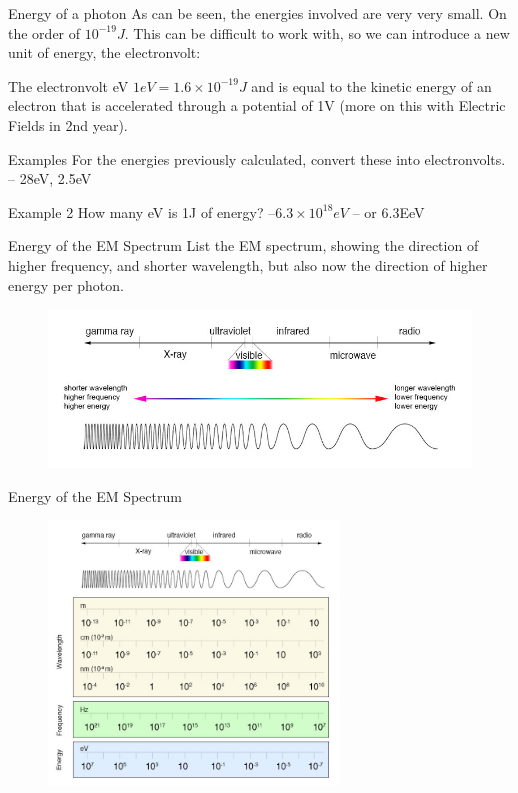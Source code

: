\documentclass[../Main.tex]{subfiles}
\begin{document}
\begin{frame}{Energy of a photon}
    As can be seen, the energies involved are very very small. On the order of $10^{-19}J$. This can be difficult to work with, so we can introduce a new unit of energy, the electronvolt:
    
    \begin{block}{The electronvolt eV}
    $1eV = 1.6\times10^{-19}J$ and is equal to the kinetic energy of an electron that is accelerated through a potential of 1V (more on this with Electric Fields in 2nd year).
    \end{block}
    \pause
    \begin{exampleblock}{Examples}
    For the energies previously calculated, convert these into electronvolts. \pause
    -- 28eV, 2.5eV
    \end{exampleblock}\pause
    \begin{exampleblock}{Example 2}
    How many eV is 1J of energy? \pause
    --$6.3\times10^{18}eV$ -- or 6.3EeV
    \end{exampleblock}
\end{frame}

\begin{frame}{Energy of the EM Spectrum}
    List the EM spectrum, showing the direction of higher frequency, and shorter wavelength, but also now the direction of higher energy per photon. \pause
    \begin{figure}
        \centering
        \includegraphics[width=\textwidth]{Quantum_Images/EM_spectrum_compare_level1_lg.jpg}
    \end{figure}
\end{frame}

\begin{frame}{Energy of the EM Spectrum}
    \begin{figure}
        \centering
        \includegraphics[height=7cm]{Quantum_Images/EM_spectrum_compare_level2_lg.jpg}
    \end{figure}
\end{frame}
\end{document}

